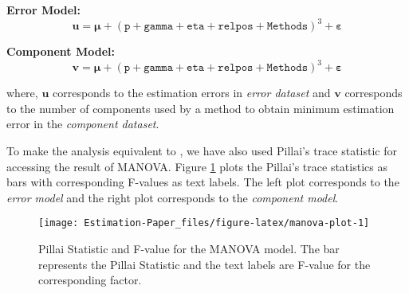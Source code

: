\documentclass[12pt,3p,authoryear]{elsarticle}
\begin{document}
\textbf{Error Model:}
\begin{equation}
  \mathbf{u} = \boldsymbol{\mu} +
  (\texttt{p} + \texttt{gamma} + \texttt{eta} +
    \texttt{relpos} + \texttt{Methods})^3 +
    \boldsymbol{\varepsilon}
  \label{eq:err-model}
\end{equation}

\textbf{Component Model:}
\begin{equation}
  \mathbf{v} = \boldsymbol{\mu} +
  (\texttt{p} + \texttt{gamma} + \texttt{eta} +
    \texttt{relpos} + \texttt{Methods})^3 +
    \boldsymbol{\varepsilon}
  \label{eq:comp-model}
\end{equation}

where, \(\mathbf{u}\) corresponds to the estimation errors in \emph{error dataset} and \(\mathbf{v}\) corresponds to the number of components used by a method to obtain minimum estimation error in the \emph{component dataset}.

To make the analysis equivalent to \citet{rimal2019pred}, we have also used Pillai's trace statistic for accessing the result of MANOVA. Figure \ref{fig:manova-plot} plots the Pillai's trace statistics as bars with corresponding F-values as text labels. The left plot corresponds to the \emph{error model} and the right plot corresponds to the \emph{component model}.



\begin{figure}[H]
\texttt{[image: Estimation-Paper\_files/figure-latex/manova-plot-1]} \caption{Pillai Statistic and F-value for the MANOVA model. The bar represents the Pillai Statistic and the text labels are F-value for the corresponding factor.}\label{fig:manova-plot}
\end{figure}
\end{document}

